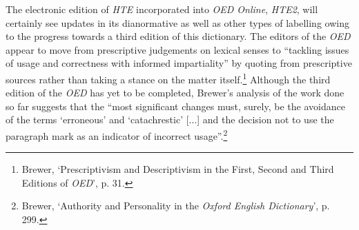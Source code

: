 The electronic edition of \textit{HTE} incorporated into \textit{OED Online}, \textit{HTE2}, will certainly see updates in its dianormative as well as other types of labelling owing to the progress towards a third edition of this dictionary. The editors of the \textit{OED} appear to move from prescriptive judgements on lexical senses to ``tackling issues of usage and correctness with informed impartiality'' by quoting from prescriptive sources rather than taking a stance on the matter itself.\footnote{Brewer, `Prescriptivism and Descriptivism in the First, Second and Third Editions of \textit{OED}', p. 31.} 
Although the third edition of the \textit{OED} has yet to be completed, Brewer's analysis of the work done so far suggests that the ``most significant changes must, surely, be the avoidance of the terms `erroneous' and `catachrestic' [...] and the decision not to use the paragraph mark as an indicator of incorrect usage''.\footnote{Brewer, `Authority and Personality in the \textit{Oxford English Dictionary}', p. 299.}

\endgroup